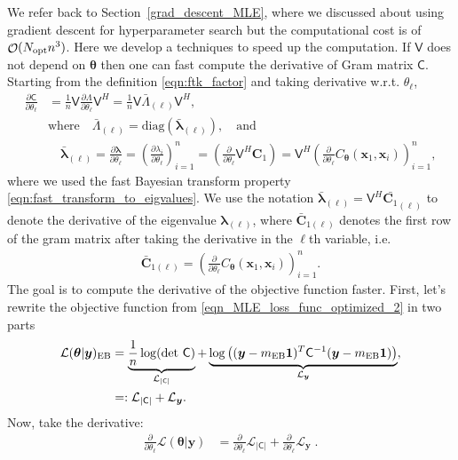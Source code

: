 \documentclass{iitthesis}          %
\DeclareMathOperator{\Order}{{\mathcal O}}
\newcommand{\bm}[1]{\boldsymbol{#1}}
\newcommand{\vlambda}{{\bm{\lambda}}}
\newcommand{\vtheta}{{\bm{\theta}}}
\newcommand{\vC}{\bm{C}}
\newcommand{\vx}{\bm{x}}
\newcommand{\vy}{\bm{y}}
\newcommand{\vone}{\bm{1}}
\newcommand{\mC}{\mathsf{C}}
\newcommand{\mCInv}{{\mathsf{C}^{-1}}}
\newcommand{\mLambda}{\mathsf{\Lambda}}
\newcommand{\mV}{\mathsf{V}}
\newcommand{\MLE}{\textup{EB}}
\newcommand{\opt}{\textup{opt}}
\newcommand{\diag}{\text{diag}}
\def\abs#1{\ensuremath{\left \lvert #1 \right \rvert}}
\begin{document}
 \label{deriv_obj_func_MLE} 
We refer back to Section~\ref{grad_descent_MLE}, where we discussed about using gradient descent for hyperparameter search but the computational cost is of $\Order(N_{\opt} n^3)$. Here we develop a techniques to speed up the computation.
If $\mV$ does not depend on $\vtheta$ then one can fast compute the derivative of Gram matrix $\mC$. Starting from the definition \eqref{eqn:ftk_factor} and taking derivative w.r.t. $\theta_\ell$, 
\begin{align}
\nonumber
\displaystyle \frac{\partial \mC}{\partial \theta_\ell} 
& = \frac 1n \mV \frac{\partial {\mLambda}}{\partial \theta_\ell} \mV^H
= \frac 1n \mV \bar{\mLambda}_{(\ell)} \mV^H,
\\
\nonumber
& \text{where} \quad \bar{\mLambda}_{(\ell)} = \diag(\bar{\vlambda}_{(\ell)}), \quad \text{and}
\\
\label{eqn:deriv_eigenval_gram_matrix}
&  \quad \bar{\vlambda}_{(\ell)} = \frac{\partial \vlambda}{\partial \theta_\ell} = \left( \frac{\partial \lambda_i}{\partial \theta_\ell} \right)_{i=1}^n 
= \left( \frac{\partial }{\partial \theta_\ell} \mV^H {\vC_1} \right)
= \mV^H \left( \frac{\partial }{\partial \theta_\ell} {C_\vtheta(\vx_1,\vx_i)} \right)_{i=1}^n,
\end{align}
where we used the fast Bayesian transform property \eqref{eqn:fast_transform_to_eigvalues}.
We use the notation $\bar{\vlambda}_{(\ell)} = \mV^H \bar{\vC_1}_{(\ell)}$ to denote the derivative of the eigenvalue ${\vlambda}_{(\ell)}$,  where $\bar{\vC}_{1(\ell)}$ denotes the first row of the gram matrix after taking the derivative in the $\ell$th variable, i.e.
\begin{align*}
\bar{\vC}_{1{(\ell)}} = \left(\frac{\partial }{\partial{\theta}_\ell} C_\vtheta(\vx_1,\vx_i) \right)_{i=1}^n.
\end{align*}
The goal is to compute the derivative of the objective function faster. First, let's rewrite the objective function from \eqref{eqn_MLE_loss_func_optimized_2} in two parts
\begin{align*}
\mathcal{L}(\vtheta | \vy)_{\MLE} &= 
\underbrace{\frac{1}{n}  \log(\det\, \mC)}_{\mathcal{L}_{\abs{\mC}}} + \underbrace{\log\left((\vy-m_\MLE\vone)^T\mCInv(\vy-m_\MLE\vone) \right)}_{\mathcal{L}_{\vy}},
\\ &=: \mathcal{L}_{\abs{\mC}} + \mathcal{L}_{\vy}.
\end{align*}
Now, take the derivative:
\begin{align*}
\frac{\partial}{\partial \theta_\ell} \mathcal{L}(\vtheta | \vy)
&=  \frac{\partial}{\partial \theta_\ell} \mathcal{L}_{\abs{\mC}} + \frac{\partial}{\partial \theta_\ell} \mathcal{L}_{\vy} \;.
\end{align*}
\end{document}
